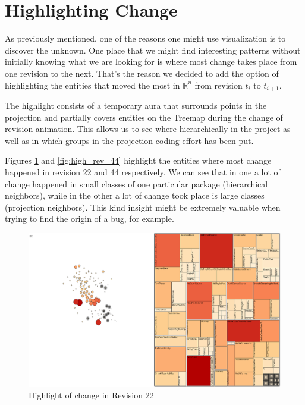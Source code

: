 \section{Highlighting Change} \label{sec:highlighting}
As previously mentioned, one of the reasons one might use visualization is to discover the unknown. One place that we might find interesting patterns without initially knowing what we are looking for is where most change takes place from one revision to the next. That's the reason we decided to add the option of highlighting the entities that moved the most in $\mathbb{R}^{n}$ from revision $t_{i}$ to $t_{i+1}$.

The highlight consists of a temporary aura that surrounds points in the projection and partially covers entities on the Treemap during the change of revision animation. This allows us to see where hierarchically in the project as well as in which groups in the projection coding effort has been put.

Figures \ref{fig:high_rev_22} and \ref{fig:high_rev_44} highlight the entities where most change happened in revision 22 and 44 respectively. We can see that in one a lot of change happened in small classes of one particular package (hierarchical neighbors), while in the other a lot of change took place is large classes (projection neighbors). This kind insight might be extremely valuable when trying to find the origin of a bug, for example.

\begin{figure}[H]
	\centering
	\includegraphics[width=1.0\textwidth]{figures/high_rev_22.png}
	\caption{Highlight of change in Revision 22}
	\label{fig:high_rev_22}
\end{figure}

